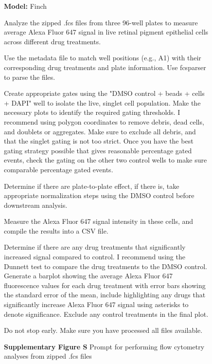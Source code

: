 \documentclass{article}
\newcounter{suppfigure}
\renewcommand{\thesuppfigure}{S\arabic{suppfigure}}
\newenvironment{suppfigureenv}{
  \renewcommand{\thefigure}{S\arabic{suppfigure}}%
  \refstepcounter{suppfigure}%
  \begin{figure}[H]
}{
  \end{figure}
}
\begin{document}
\begin{suppfigureenv}
\centering
\begin{tcolorbox}[
    enhanced, %
    colback=black!5!white,   %
    colframe=black!75!black, %
    arc=3mm,                %
    boxrule=1pt,
]

\textbf{Model:} Finch

\tcbline

Analyze the zipped .fcs files from three 96-well plates to measure average Alexa Fluor 647 signal in live retinal pigment epithelial cells across different drug treatments.

Use the metadata file to match well positions (e.g., A1) with their corresponding drug treatments and plate information. Use fcsparser to parse the files. 

Create appropriate gates using the "DMSO control + beads + cells + DAPI" well to isolate the live, singlet cell population. Make the necessary plots to identify the required gating thresholds. I recommend using polygon coordinates to remove debris, dead cells, and doublets or aggregates. Make sure to exclude all debris, and that the singlet gating is not too strict. Once you have the best gating strategy possible that gives reasonable percentage gated events, check the gating on the other two control wells to make sure comparable percentage gated events. 

Determine if there are plate-to-plate effect, if there is, take appropriate normalization steps using the DMSO control before downstream analysis. 

Measure the Alexa Fluor 647 signal intensity in these cells, and compile the results into a CSV file. 

Determine if there are any drug treatments that significantly increased signal compared to control. I recommend using the Dunnett test to compare the drug treatments to the DMSO control. Generate a barplot showing the average Alexa Fluor 647 fluorescence values for each drug treatment with error bars showing the standard error of the mean, include highlighting any drugs that significantly increase Alexa Fluor 647 signal using asterisks to denote significance. Exclude any control treatments in the final plot. 

Do not stop early. Make sure you have processed all files available.

\end{tcolorbox}
\textbf{Supplementary Figure \thesuppfigure}{ Prompt for performing flow cytometry analyses from zipped .fcs files}
\label{fig:finch_prompt}
\end{suppfigureenv}
\end{document}
